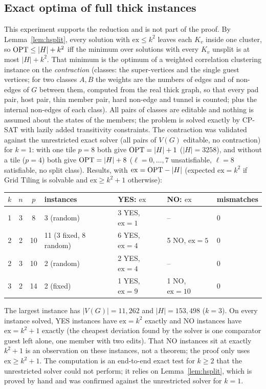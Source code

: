 \subsection{Exact optima of full thick instances}\label{sec:hexact}
This experiment supports the reduction and is not part of the proof. By Lemma~\ref{lem:hsplit}, every solution with $\mathrm{ex}\le k^2$ leaves each $K_v$ inside one cluster, so $\mathrm{OPT}\le|H|+k^2$ iff the minimum over solutions with every $K_v$ unsplit is at most $|H|+k^2$. That minimum is the optimum of a weighted correlation clustering instance on the \emph{contraction} (classes: the super-vertices and the single guest vertices; for two classes $A,B$ the weights are the numbers of edges and of non-edges of $G$ between them, computed from the real thick graph, so that every pad pair, host pair, thin member pair, hard non-edge and tunnel is counted; plus the internal non-edges of each class). All pairs of classes are editable and nothing is assumed about the states of the members; the problem is solved exactly by CP-SAT with lazily added transitivity constraints. The contraction was validated against the unrestricted exact solver (all pairs of $V(G)$ editable, no contraction) for $k=1$: with one tile $p=8$ both give $\mathrm{OPT}=|H|+1$ ($|H|=3258$), and without a tile ($p=4$) both give $\mathrm{OPT}=|H|+8$ ($\ell=0,\dots,7$ unsatisfiable, $\ell=8$ satisfiable, no split class). Results, with $\mathrm{ex}=\mathrm{OPT}-|H|$ (expected $\mathrm{ex}=k^2$ if Grid Tiling is solvable and $\mathrm{ex}\ge k^2+1$ otherwise):
\begin{center}
\small
\begin{tabular}{@{}cccllll@{}}
\hline
$k$ & $n$ & $p$ & instances & YES: $\mathrm{ex}$ & NO: $\mathrm{ex}$ & mismatches\\\hline
1 & 3 & 8 & 3 (random) & 3 YES, $\mathrm{ex}=1$ & -- & 0\\
2 & 2 & 10 & 11 (3 fixed, 8 random) & 6 YES, $\mathrm{ex}=4$ & 5 NO, $\mathrm{ex}=5$ & 0\\
2 & 3 & 10 & 2 (random) & 2 YES, $\mathrm{ex}=4$ & -- & 0\\
3 & 2 & 14 & 2 (fixed) & 1 YES, $\mathrm{ex}=9$ & 1 NO, $\mathrm{ex}=10$ & 0\\\hline
\end{tabular}
\end{center}
The largest instance has $|V(G)|=11{,}262$ and $|H|=153{,}498$ ($k=3$). On every instance solved, YES instances have $\mathrm{ex}=k^2$ exactly and NO instances have $\mathrm{ex}=k^2+1$ exactly (the cheapest deviation found by the solver is one comparator guest left alone, one member with two edits). That NO instances sit at exactly $k^2+1$ is an observation on these instances, not a theorem; the proof only uses $\mathrm{ex}\ge k^2+1$. The computation is an end-to-end exact test for $k\ge2$ that the unrestricted solver could not perform; it relies on Lemma~\ref{lem:hsplit}, which is proved by hand and was confirmed against the unrestricted solver for $k=1$.


